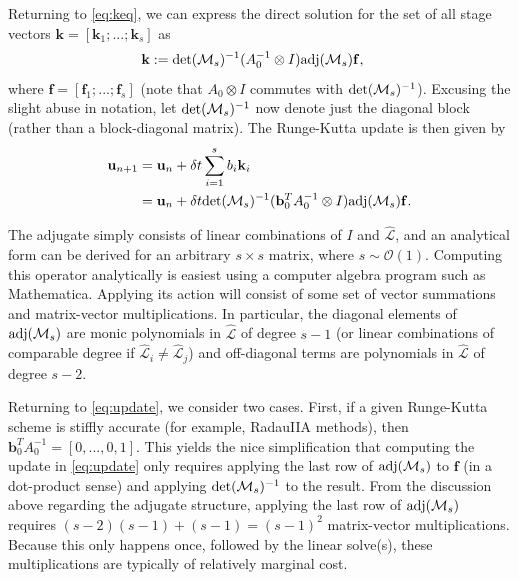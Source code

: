 \documentclass[review]{siamart}
\begin{document}
Returning to \eqref{eq:keq}, we can express the direct solution for the set of all
stage vectors ${\mathbf{k}} = [\mathbf{k}_1; ...; \mathbf{k}_s]$ as
%
\begin{align*}
\mathbf{k} &:= \textnormal{det}(\mathcal{M}_s)^{-1}
	(A_0^{-1}\otimes I)\textnormal{adj}(\mathcal{M}_s)\mathbf{f},
\end{align*}
%
where $\mathbf{f} = [\mathbf{f}_1; ...; \mathbf{f}_s]$ (note that
$A_0\otimes I$ commutes with $\textnormal{det}(\mathcal{M}_s)^{-1}$). Excusing the slight
abuse in notation, let $\textnormal{det}(\mathcal{M}_s)^{-1}$ now denote just the diagonal
block (rather than a block-diagonal matrix). The Runge-Kutta update is then given by
%
\begin{align}\nonumber
\mathbf{u}_{n+1} & = \mathbf{u}_n + \delta t\sum_{i=1}^s b_i{\mathbf{k}}_i \\
& = \mathbf{u}_n + \delta t\textnormal{det}(\mathcal{M}_s)^{-1}
	(\mathbf{b}_0^TA_0^{-1}\otimes I)\textnormal{adj}(\mathcal{M}_s)\mathbf{f}.\label{eq:update}
\end{align}
%

The adjugate simply consists of linear combinations of $I$ and $\widehat{\mathcal{L}}$, and an
analytical form can be derived for an arbitrary $s\times s$ matrix, where $s\sim\mathcal{O}(1)$.
Computing this operator analytically is easiest using a computer algebra program
such as Mathematica. Applying its action will consist of some set of vector summations
and matrix-vector multiplications. In particular, the diagonal elements of
$\textnormal{adj}(\mathcal{M}_s)$ are monic polynomials in $\widehat{\mathcal{L}}$ of degree
$s-1$ (or linear combinations of comparable degree if $\widehat{\mathcal{L}}_i\neq\widehat{\mathcal{L}}_j$)
and off-diagonal terms are polynomials in $\widehat{\mathcal{L}}$ of degree $s-2$. 

Returning to \eqref{eq:update}, we consider two cases. First, if a given Runge-Kutta
scheme is stiffly accurate (for example, RadauIIA methods),
then $\mathbf{b}_0^TA_0^{-1} = [0,...,0,1]$. This yields
the nice simplification that computing the update in \eqref{eq:update} only requires
applying the last row of $\textnormal{adj}(\mathcal{M}_s)$ to $\mathbf{f}$ (in a
dot-product sense) and applying $\textnormal{det}(\mathcal{M}_s)^{-1}$ to the result. From
the discussion above regarding the adjugate structure, applying the last row of
$\textnormal{adj}(\mathcal{M}_s)$ requires $(s-2)(s-1) + (s-1) = (s-1)^2$ matrix-vector
multiplications. Because this only happens once, followed by the linear solve(s),
these multiplications are typically of relatively marginal cost.
\end{document}
